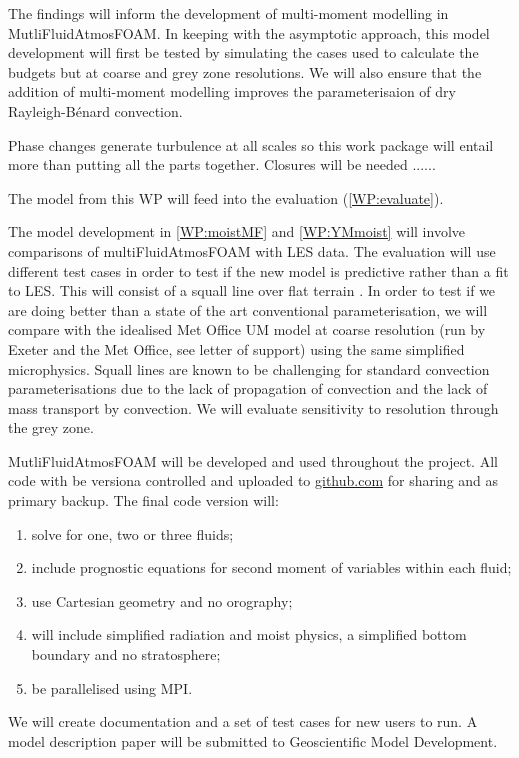 \documentclass[11pt,a4paper]{article}
\begin{document}
The findings will inform the development of multi-moment modelling in MutliFluidAtmosFOAM. In keeping with the asymptotic approach, this model development will first be tested by simulating the cases used to calculate the budgets but at coarse and grey zone resolutions. We will also ensure that the addition of multi-moment modelling improves the parameterisaion of dry Rayleigh-B\'enard convection. 


Phase changes generate turbulence at all scales so this work package will entail more than putting all the parts together. Closures will be needed ......

The model from this WP will feed into the evaluation (\ref{WP:evaluate}).


The model development in \ref{WP:moistMF} and \ref{WP:YMmoist} will involve comparisons of multiFluidAtmosFOAM with LES data. The evaluation will use different test cases in order to test if the new model is predictive rather than a fit to LES. This will consist of a squall line over flat terrain \cite[]{FM06}. In order to test if we are doing better than a state of the art conventional parameterisation, we will compare with the idealised Met Office UM model at coarse resolution (run by Exeter and the Met Office, see letter of support) using the same simplified microphysics. Squall lines are known to be challenging for standard convection parameterisations \cite[e.g.][]{LCD+08} due to the lack of propagation of convection and the lack of mass transport by convection. We will evaluate sensitivity to resolution through the grey zone. 


MutliFluidAtmosFOAM will be developed and used throughout the project. All code with be versiona controlled and uploaded to \url{github.com} for sharing and as primary backup. The final code version will:
\begin{enumerate}
\item solve for one, two or three fluids;
\item include prognostic equations for second moment of variables within each fluid;
\item use Cartesian geometry and no orography;
\item will include simplified radiation and moist physics, a simplified bottom boundary and no stratosphere;
\item be parallelised using MPI.
\end{enumerate}
We will create documentation and a set of test cases for new users to run. A model description paper will be submitted to Geoscientific Model Development.
\end{document}
